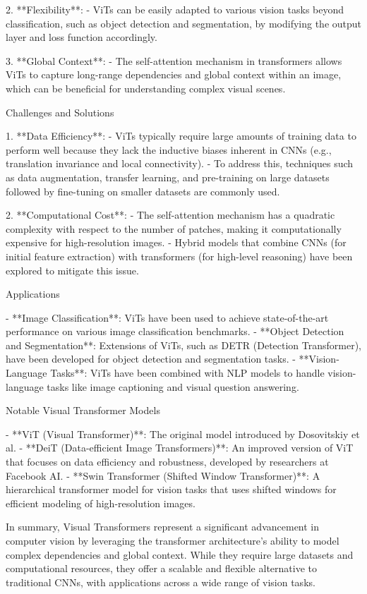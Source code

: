2. **Flexibility**:
   - ViTs can be easily adapted to various vision tasks beyond classification, such as object detection and segmentation, by modifying the output layer and loss function accordingly.

3. **Global Context**:
   - The self-attention mechanism in transformers allows ViTs to capture long-range dependencies and global context within an image, which can be beneficial for understanding complex visual scenes.

 Challenges and Solutions

1. **Data Efficiency**:
   - ViTs typically require large amounts of training data to perform well because they lack the inductive biases inherent in CNNs (e.g., translation invariance and local connectivity).
   - To address this, techniques such as data augmentation, transfer learning, and pre-training on large datasets followed by fine-tuning on smaller datasets are commonly used.

2. **Computational Cost**:
   - The self-attention mechanism has a quadratic complexity with respect to the number of patches, making it computationally expensive for high-resolution images.
   - Hybrid models that combine CNNs (for initial feature extraction) with transformers (for high-level reasoning) have been explored to mitigate this issue.

 Applications

- **Image Classification**: ViTs have been used to achieve state-of-the-art performance on various image classification benchmarks.
- **Object Detection and Segmentation**: Extensions of ViTs, such as DETR (Detection Transformer), have been developed for object detection and segmentation tasks.
- **Vision-Language Tasks**: ViTs have been combined with NLP models to handle vision-language tasks like image captioning and visual question answering.

 Notable Visual Transformer Models

- **ViT (Visual Transformer)**: The original model introduced by Dosovitskiy et al.
- **DeiT (Data-efficient Image Transformers)**: An improved version of ViT that focuses on data efficiency and robustness, developed by researchers at Facebook AI.
- **Swin Transformer (Shifted Window Transformer)**: A hierarchical transformer model for vision tasks that uses shifted windows for efficient modeling of high-resolution images.

In summary, Visual Transformers represent a significant advancement in computer vision by leveraging the transformer architecture's ability to model complex dependencies and global context. While they require large datasets and computational resources, they offer a scalable and flexible alternative to traditional CNNs, with applications across a wide range of vision tasks.

